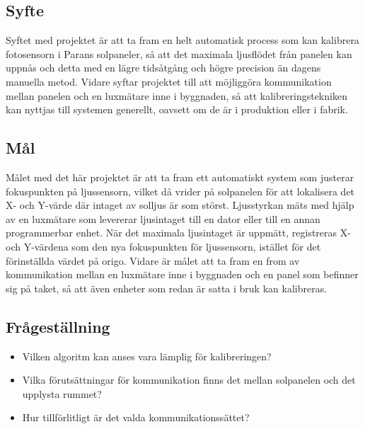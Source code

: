     \subsection{Syfte} %
    \label{sub:syfte}
          Syftet med projektet är att ta fram en helt automatisk process som kan kalibrera fotosensorn i Parans solpaneler, så att det maximala ljusflödet från panelen kan uppnås och detta med en lägre tidsåtgång och högre precision än dagens manuella metod. 
          Vidare syftar projektet till att möjliggöra kommunikation mellan panelen och en lux\-mätare inne i byggnaden, så att kalibreringstekniken kan nyttjas till systemen generellt, oavsett om de är i produktion eller i fabrik.

    \subsection{Mål} %
    \label{sub:mal}
        Målet med det här projektet är att ta fram ett automatiskt system som justerar fokuspunkten på ljussensorn, vilket då vrider på solpanelen för att lokalisera det X- och Y-värde där intaget av solljus är som störst. 
        Ljusstyrkan mäts med hjälp av en luxmätare som levererar ljusintaget till en dator eller till en annan programmerbar enhet. 
        När det maximala ljusintaget är uppmätt, registreras X- och Y-värdena som den nya fokuspunkten för ljussensorn, istället för det förinställda värdet på origo. 
        Vidare är målet att ta fram en from av kommunikation mellan en luxmätare inne i byggnaden och en panel som befinner sig på taket, så att även enheter som redan är satta i bruk kan kalibreras. 


    \subsection{Frågeställning} %
    \label{sub:fragestallning}
        \begin{itemize}
            \item Vilken algoritm kan anses vara lämplig för kalibreringen?\\
            \item Vilka förutsättningar för kommunikation finns det mellan solpanelen och det upplysta rummet? \\
            \item Hur tillförlitligt är det valda kommunikationssättet? \\
            
        \end{itemize}

